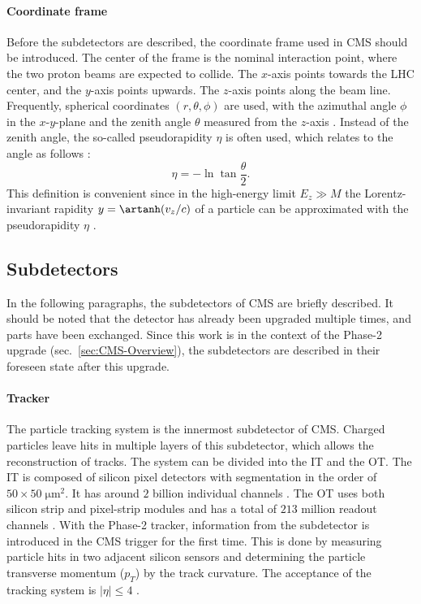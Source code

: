 \paragraph{Coordinate frame}
Before the subdetectors are described, the coordinate frame used in \ac{CMS} should be introduced. The center of the frame is the nominal interaction point, where the two proton beams are expected to collide. The $x$-axis points towards the \ac{LHC} center, and the $y$-axis points upwards. The $z$-axis points along the beam line. Frequently, spherical coordinates $(r,\theta,\phi)$ are used, with the azimuthal angle $\phi$ in the $x$-$y$-plane and the zenith angle $\theta$ measured from the $z$-axis \cite{CMS-Main}. Instead of the zenith angle, the so-called pseudorapidity $\eta$ is often used, which relates to the angle as follows \cite{Book-KolanoskiWermes}:
\begin{equation}
\eta=-\ln\tan\frac{\theta}{2}.
\end{equation}
This definition is convenient since in the high-energy limit $E_z \gg M$ the Lorentz-invariant rapidity $y=\artanh(v_z/c)$ of a particle can be approximated with the pseudorapidity $\eta$ \cite{Book-KolanoskiWermes}.

\subsection{Subdetectors}
\label{sec:CMS-Subdetectors}
In the following paragraphs, the subdetectors of \ac{CMS} are briefly described. It should be noted that the detector has already been upgraded multiple times, and parts have been exchanged. Since this work is in the context of the Phase-2 upgrade (sec.\ \ref{sec:CMS-Overview}), the subdetectors are described in their foreseen state after this upgrade.
\paragraph{Tracker}
The particle tracking system is the innermost subdetector of \ac{CMS}. Charged particles leave hits in multiple layers of this subdetector, which allows the reconstruction of tracks. The system can be divided into the \ac{IT} and the \ac{OT}. The \ac{IT} is composed of silicon pixel detectors with segmentation in the order of $50\times 50\;\si{\micro\meter^2}$. It has around $2$ billion individual channels \cite{CMS-Phase2Tracker-ConferenceReport}. The \ac{OT} uses both silicon strip and pixel-strip modules and has a total of $213$ million readout channels \cite{CMS-Phase2Tracker-ConferenceReport}. With the Phase-2 tracker, information from the subdetector is introduced in the \ac{CMS} trigger for the first time. This is done by measuring particle hits in two adjacent silicon sensors and determining the particle transverse momentum ($p_T$) by the track curvature. The acceptance of the tracking system is $\left| \eta \right|\leq 4$ \cite{CMS-Phase2Tracker}.
